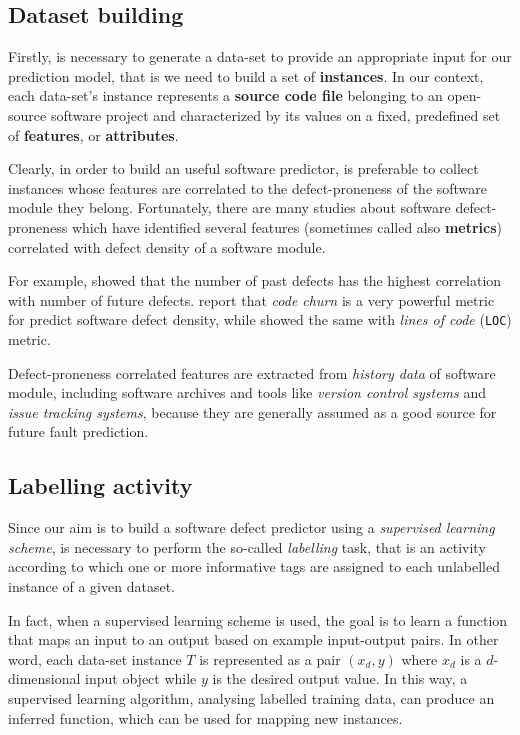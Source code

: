 \documentclass[sigconf]{acmart}
\begin{document}
\subsection{Dataset building}

Firstly, is necessary to generate a data-set to provide an appropriate input for our prediction model, that is we need to build a set of \textbf{instances}. In our context, each data-set's instance represents a \textbf{source code file} belonging to an open-source software project and characterized by its values on a fixed, predefined set of \textbf{features}, or \textbf{attributes}.

Clearly, in order to build an useful software predictor, is preferable to collect instances whose features are correlated to the defect-proneness of the software module they belong. Fortunately, there are many studies about software defect-proneness which have identified several features (sometimes called also \textbf{metrics}) correlated with defect density of a software module. 

For example, \citet{PredictingDefectsForEclipse} showed that the number of past defects has the highest correlation with number of future defects. \citet{Nagappan} report that \textit{code churn} is a very powerful metric for predict software defect density, while \citet{Gyimothy} showed the same with \textit{lines of code} (\texttt{LOC}) metric.

Defect-proneness correlated features are extracted from \textit{history data} of software module, including software archives and tools like \textit{version control systems} and \textit{issue tracking systems}, because they are generally assumed as a good source for future fault prediction. 

\subsection{Labelling activity}

Since our aim is to build a software defect predictor using a \textit{supervised learning scheme}, is necessary to perform the so-called \textit{labelling} task, that is an activity according to which one or more informative tags are assigned to each unlabelled instance of a given dataset.

In fact, when a supervised learning scheme is used, the goal is to learn a function that maps an input to an output based on example input-output pairs. In other word, each data-set instance $T$ is represented as a pair $(x_{d}, y)$ where $x_d$ is a $d$-dimensional input object while $y$ is the desired output value. In this way, a supervised learning algorithm, analysing labelled training data, can produce an inferred function, which can be used for mapping new instances.
\end{document}
